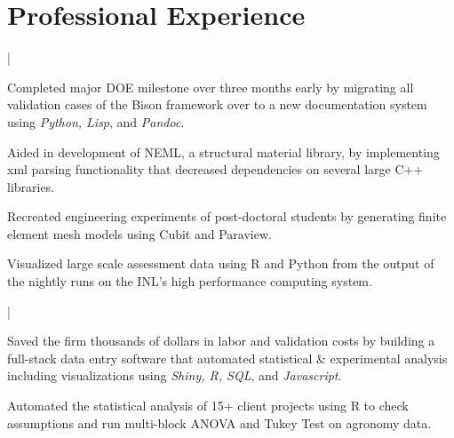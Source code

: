\documentclass[letterpaper]{deedy-resume}
\begin{document}
\begin{minipage}[t]{0.65\textwidth} 
\section{Professional Experience}

 |
\vspace{\topsep} 
\begin{tightitemize}
\item Completed major DOE milestone over three months early by migrating all validation cases of the Bison framework over to a new documentation system using \textit{Python, Lisp}, and \textit{Pandoc}. \\
\item Aided in development of NEML, a structural material library, by implementing xml parsing functionality that decreased dependencies on several large C++ libraries.\\
\item Recreated engineering experiments of post-doctoral students by generating finite element mesh models using Cubit and Paraview. \\ 
\item Visualized large scale assessment data using R and Python from the output of the nightly runs on the INL's high performance computing system. \\
\end{tightitemize}

\sectionspace 

 |
\begin{tightitemize}
  \item Saved the firm thousands of dollars in labor and validation costs by building a full-stack data entry software that automated statistical \& experimental analysis including visualizations using \textit{Shiny, R, SQL}, and \textit{Javascript}. \\
  \item Automated the statistical analysis of 15+ client projects using R to check assumptions and run multi-block ANOVA and Tukey Test on agronomy data.  \\
\end{tightitemize}

\sectionspace 


\end{minipage}
\end{document}
